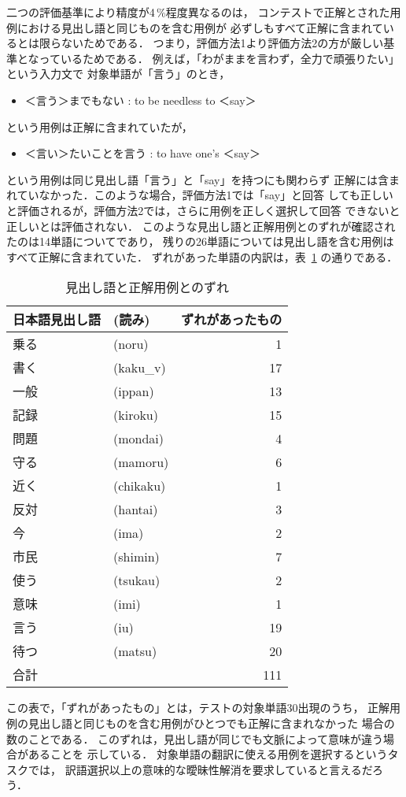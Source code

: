 二つの評価基準により精度が4\,\%程度異なるのは，
コンテストで正解とされた用例における見出し語と同じものを含む用例が
必ずしもすべて正解に含まれているとは限らないためである．
つまり，評価方法1より評価方法2の方が厳しい基準となっているためである．
例えば，「わがままを言わず，全力で頑張りたい」という入力文で
対象単語が「言う」のとき，
\begin{itemize}
\item ＜言う＞までもない : to be needless to ＜say＞
\end{itemize}
という用例は正解に含まれていたが，
\begin{itemize}
\item ＜言い＞たいことを言う : to have one's ＜say＞
\end{itemize}
という用例は同じ見出し語「言う」と「say」を持つにも関わらず
正解には含まれていなかった．このような場合，評価方法1では「say」と回答
しても正しいと評価されるが，評価方法2では，さらに用例を正しく選択して回答
できないと正しいとは評価されない．
このような見出し語と正解用例とのずれが確認されたのは14単語についてであり，
残りの26単語については見出し語を含む用例はすべて正解に含まれていた．
ずれがあった単語の内訳は，表~\ref{tab:discrepancy} の通りである．
\begin{table}[htbp]
  \begin{center}
    \caption{見出し語と正解用例とのずれ}
    \label{tab:discrepancy}
    \begin{tabular}[c]{|ll|r|}
      \hline
      日本語見出し語 & (読み) & ずれがあったもの\\
      \hline
      乗る & (noru) & 1\\
      書く & (kaku\_v) & 17\\
      一般 & (ippan) & 13\\
      記録 & (kiroku) & 15\\
      問題 & (mondai) & 4\\
      守る & (mamoru) & 6\\
      近く & (chikaku) & 1\\
      反対 & (hantai) & 3\\
      今 & (ima) & 2\\
      市民 & (shimin) & 7\\
      使う & (tsukau) & 2\\
      意味 & (imi) & 1\\
      言う & (iu) & 19\\
      待つ & (matsu) & 20\\
      \hline
      合計 & & 111\\
      \hline
    \end{tabular}
  \end{center}
\end{table}
この表で，「ずれがあったもの」とは，テストの対象単語30出現のうち，
正解用例の見出し語と同じものを含む用例がひとつでも正解に含まれなかった
場合の数のことである．
このずれは，見出し語が同じでも文脈によって意味が違う場合があることを
示している．
対象単語の翻訳に使える用例を選択するというタスクでは，
訳語選択以上の意味的な曖昧性解消を要求していると言えるだろう．

